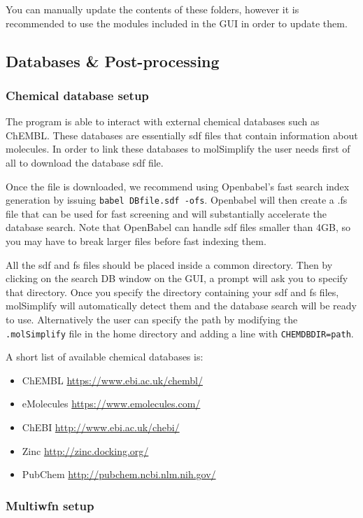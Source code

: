 \documentclass[a4paper,12pt]{assignment}
\begin{document}
You can manually update the contents of these folders, however it is recommended to use the modules included in the GUI in order to update them.

\subsection{Databases \& Post-processing}\label{dbpp}

\subsubsection{Chemical database setup}


The program is able to interact with external chemical databases such as ChEMBL. These databases are essentially sdf files that contain information about molecules. In order to link these databases to molSimplify the user needs first of all to download the database sdf file. 

Once the file is downloaded, we recommend using Openbabel's fast search index generation by issuing  \texttt{babel DBfile.sdf -ofs}. Openbabel will then create a .fs file that can be used for fast screening and will substantially accelerate the database search. Note that OpenBabel can handle sdf files smaller than 4GB, so you may have to break larger files before fast indexing them. 

All the sdf and fs files should be placed inside a common directory. Then by clicking on the search DB window on the GUI, a prompt will ask you to specify that directory. Once you specify the directory containing your sdf and fs files, molSimplify will automatically detect them and the database search will be ready to use. Alternatively the user can specify the path by modifying the \texttt{.molSimplify} file in the home directory and adding a line with \texttt{CHEMDBDIR=path}. 

A short list of available chemical databases is:
\begin{itemize}
\item ChEMBL \url{https://www.ebi.ac.uk/chembl/}
\item eMolecules \url{https://www.emolecules.com/}
\item ChEBI \url{http://www.ebi.ac.uk/chebi/}
\item Zinc \url{http://zinc.docking.org/}
\item PubChem \url{http://pubchem.ncbi.nlm.nih.gov/}
\end{itemize}

\subsubsection{Multiwfn setup}
\end{document}
